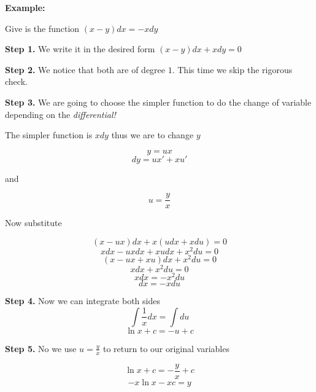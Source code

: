 \textbf{Example:}

Give is the function \((x -y)dx = - xdy\)

\textbf{Step 1.} We write it in the desired form \((x - y)dx + xdy = 0\)

\textbf{Step 2.} We notice that both are of degree \(1\). This time we skip the rigorous check.

\textbf{Step 3.} We are going to choose the simpler function to do the change of variable 
depending on the \emph{differential!} 

The simpler function is \(xdy\) thus we are to change \(y\)

\[y = ux\]
\[dy = ux' + xu'\]

and 

\[u = \frac{y}{x}\]

Now substitute

\[(x - ux)dx + x(udx + xdu) = 0\]
\[xdx - uxdx + xudx + x^{2}du = 0\]
\[(x - ux + xu)dx + x^{2}du = 0\]
\[xdx + x^{2}du = 0\]
\[xdx = - x^{2}du\]
\[dx = - xdu\]

\textbf{Step 4.} Now we can integrate both sides
\[\int \frac{1}{x}dx = \int du\]
\[\ln x + c = -u + c\]

\textbf{Step 5.} No we use \(u = \frac{y}{x}\) to return to our original variables

\[\ln x + c = -\frac{y}{x} + c\]
\[-x\ln x - xc = y\]


\newpage